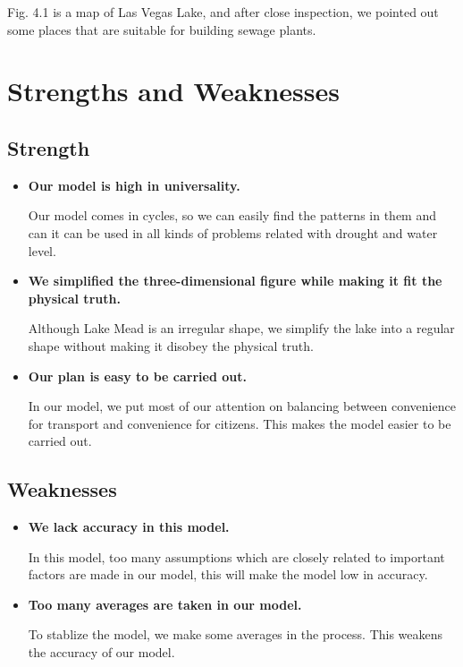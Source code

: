 \documentclass[12pt]{article}
\theoremstyle{definition}
\theoremstyle{remark}
\numberwithin{equation}{section}
\begin{document}
			Fig. 4.1 is a map of Las Vegas Lake, and after close inspection, we pointed out some places that are suitable for building sewage plants.

\newpage
\section{Strengths and Weaknesses}
	\subsection{Strength}
		\begin{itemize}
			\item \textbf{Our model is high in universality.}
			
			Our model comes in cycles, so we can easily find the patterns in them and can it can be used in all kinds of  problems related with drought and water level.

			\item \textbf{We simplified the three-dimensional figure while making it fit the physical truth.}
			
			Although Lake Mead is an irregular shape, we simplify the lake into a regular shape without making it disobey the physical truth.

			\item \textbf{Our plan is easy to be carried out.}
			
			In our model, we put most of our attention on balancing between convenience for transport and convenience for citizens. This makes the model easier to be carried out.
		\end{itemize}

	\subsection{Weaknesses}
		\begin{itemize}
			\item \textbf{We lack accuracy in this model.}
			
			In this model, too many assumptions which are closely related to important factors are made in our model, this will make the model low in accuracy.
			
			\item \textbf{Too many averages are taken in our model.}
			
			To stablize the model, we make some averages in the process. This weakens the accuracy of our model.
		\end{itemize}
\end{document}
